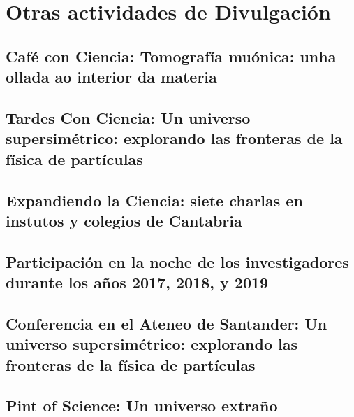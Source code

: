 \documentclass[a4paper, 11pt, twoside, openright]{report}
\begin{document}
\section{Otras actividades de Divulgación}

\subsection{Café con Ciencia: Tomografía muónica: unha ollada ao interior da materia}


\subsection{Tardes Con Ciencia: Un universo supersimétrico: explorando las fronteras de la física de partículas}


\subsection{Expandiendo la Ciencia: siete charlas en instutos y colegios de Cantabria}


\subsection{Participación en la noche de los investigadores durante los años 2017, 2018, y 2019}


\subsection{Conferencia en el Ateneo de Santander: Un universo supersimétrico: explorando las fronteras de la física de partículas}


\subsection{Pint of Science: Un universo extraño}

\end{document}
